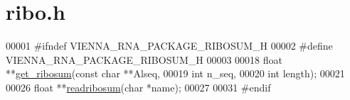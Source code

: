 \hypertarget{ribo_8h_source}{}\section{ribo.\+h}
\label{ribo_8h_source}

\begin{DoxyCode}
00001 \textcolor{preprocessor}{#ifndef VIENNA\_RNA\_PACKAGE\_RIBOSUM\_H}
00002 \textcolor{preprocessor}{#define VIENNA\_RNA\_PACKAGE\_RIBOSUM\_H}
00003 
00018 \textcolor{keywordtype}{float} **\hyperlink{group__consensus__fold_ga1116aed4b2dab5252cd23946d47d52c3}{get\_ribosum}(\textcolor{keyword}{const} \textcolor{keywordtype}{char} **Alseq,
00019                     \textcolor{keywordtype}{int} n\_seq,
00020                     \textcolor{keywordtype}{int} length);
00021 
00026 \textcolor{keywordtype}{float}   **\hyperlink{group__file__utils_ga5e125c9586fcd4e2e1559fe76f7289cc}{readribosum}(\textcolor{keywordtype}{char} *name);
00027 
00031 \textcolor{preprocessor}{#endif}
\end{DoxyCode}
